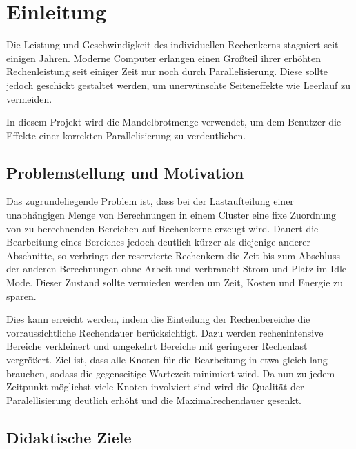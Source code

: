 \section{Einleitung}

Die Leistung und Geschwindigkeit des individuellen Rechenkerns stagniert seit einigen Jahren.
Moderne Computer erlangen einen Großteil ihrer erhöhten Rechenleistung
seit einiger Zeit nur noch durch Parallelisierung.
Diese sollte jedoch geschickt gestaltet werden, um unerwünschte Seiteneffekte
wie Leerlauf zu vermeiden.

In diesem Projekt wird die Mandelbrotmenge verwendet, um dem Benutzer die Effekte einer korrekten Parallelisierung zu verdeutlichen.

\subsection{Problemstellung und Motivation}

Das zugrundeliegende Problem ist, dass bei der Lastaufteilung einer unabhängigen Menge
von Berechnungen in einem Cluster eine fixe Zuordnung von
zu berechnenden Bereichen auf Rechenkerne erzeugt wird. Dauert die Bearbeitung eines Bereiches jedoch deutlich kürzer
als diejenige anderer Abschnitte, so verbringt der reservierte Rechenkern die Zeit bis zum Abschluss der anderen Berechnungen
ohne Arbeit und verbraucht Strom und Platz im Idle-Mode.
Dieser Zustand sollte vermieden werden um Zeit, Kosten und Energie zu sparen.

Dies kann erreicht werden, indem die Einteilung der Rechenbereiche die vorraussichtliche Rechendauer berücksichtigt.
Dazu werden rechenintensive Bereiche verkleinert und umgekehrt Bereiche mit geringerer Rechenlast vergrößert.
Ziel ist, dass alle Knoten für die Bearbeitung in etwa gleich lang brauchen,
sodass die gegenseitige Wartezeit minimiert wird.
Da nun zu jedem Zeitpunkt möglichst viele Knoten involviert sind wird die Qualität der Paralellisierung deutlich erhöht
und die Maximalrechendauer gesenkt.

\subsection{Didaktische Ziele}

